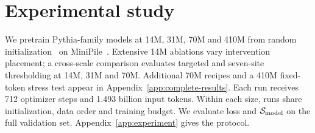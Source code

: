 \section{Experimental study}
\label{sec:experiments}

We pretrain Pythia-family models at 14M, 31M, 70M and 410M from random initialization~\citep{biderman2023pythia} on MiniPile~\citep{kaddour2023minipile}. Extensive 14M ablations vary intervention placement; a cross-scale comparison evaluates targeted and seven-site thresholding at 14M, 31M and 70M. Additional 70M recipes and a 410M fixed-token stress test appear in Appendix~\ref{app:complete-results}. Each run receives 712 optimizer steps and 1.493 billion input tokens. Within each size, runs share initialization, data order and training budget. We evaluate loss and $\mathcal{S}_{\mathrm{model}}$ on the full validation set. Appendix~\ref{app:experiment} gives the protocol.




